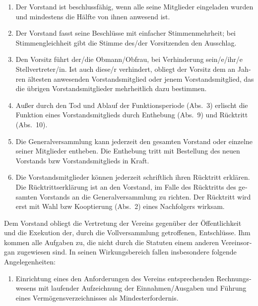 \begin{otherlanguage}{german}
\begin{enumerate}[statutenenum]
    \item Der Vorstand ist beschlussfähig, wenn alle seine Mitglieder eingeladen wurden und mindestens die Hälfte von ihnen anwesend ist.

    \item Der Vorstand fasst seine Beschlüsse mit einfacher Stimmenmehrheit;
        bei Stimmengleichheit gibt die Stimme des/der Vorsitzenden den Ausschlag.

    \item Den Vorsitz führt der/die Obmann/Obfrau, bei Verhinderung sein/e/ihr/e Stellvertreter/in.
        Ist auch diese/r verhindert, obliegt der Vorsitz dem an Jahren ältesten anwesenden Vorstandsmitglied oder jenem Vorstandsmitglied, das die übrigen Vorstandsmitglieder mehrheitlich dazu bestimmen.

    \item Außer durch den Tod und Ablauf der Funktionsperiode (Abs.\ 3) erlischt die Funktion eines Vorstandsmitglieds durch Enthebung (Abs.\ 9) und Rücktritt (Abs.\ 10).

    \item Die Generalversammlung kann jederzeit den gesamten Vorstand oder einzelne seiner Mitglieder entheben.
        Die Enthebung tritt mit Bestellung des neuen Vorstands bzw Vorstandsmitglieds in Kraft.

    \item Die Vorstandsmitglieder können jederzeit schriftlich ihren Rücktritt erklären.
        Die Rücktrittserklärung ist an den Vorstand, im Falle des Rücktritts des gesamten Vorstands an die Generalversammlung zu richten.
        Der Rücktritt wird erst mit Wahl bzw Kooptierung (Abs.\ 2) eines Nachfolgers wirksam.
\end{enumerate}


Dem Vorstand obliegt die Vertretung der Vereins gegenüber der Öffentlichkeit und die Exekution der, durch die Vollversammlung getroffenen, Entschlüsse.
Ihm kommen alle Aufgaben zu, die nicht durch die Statuten einem anderen Vereinsorgan zugewiesen sind.
In seinen Wirkungsbereich fallen insbesondere folgende Angelegenheiten:

\begin{enumerate}[statutenenum]
    \item Einrichtung eines den Anforderungen des Vereins entsprechenden Rechnungswesens mit laufender Aufzeichnung der Einnahmen/Ausgaben und Führung eines Vermögensverzeichnisses als Mindesterfordernis.


\end{enumerate}
\end{otherlanguage}
